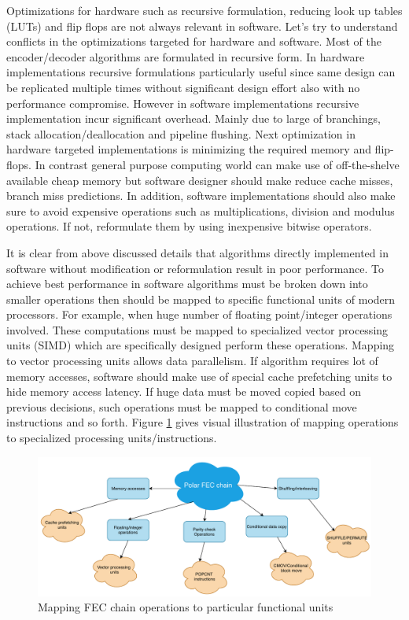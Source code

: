 Optimizations for hardware such as recursive formulation, reducing look up tables (LUTs) and flip flops are not always relevant in software. Let's try to understand conflicts in the optimizations targeted for hardware and software. Most of the encoder/decoder algorithms are formulated in recursive form. In hardware implementations recursive formulations particularly useful since same design can be replicated multiple times without significant design effort also with no performance compromise. However in software implementations recursive implementation incur significant overhead. Mainly due to large of branchings, stack allocation/deallocation and pipeline flushing. Next optimization in hardware targeted implementations is minimizing the required memory and flip-flops. In contrast general purpose computing world can make use of off-the-shelve available cheap memory but software designer should make reduce cache misses, branch miss predictions. In addition, software implementations should also make sure to avoid expensive operations such as multiplications, division and modulus operations. If not, reformulate them by using inexpensive bitwise operators. \newline

It is clear from above discussed details that algorithms directly implemented in software without modification or reformulation result in poor performance. To achieve best performance in software algorithms must be broken down into smaller operations then should be mapped to specific functional units of modern processors. For example, when huge number of floating point/integer operations involved. These computations must be mapped to specialized vector processing units (SIMD) which are specifically designed perform these operations. Mapping to vector processing units allows data parallelism. If algorithm requires lot of memory accesses, software should make use of special cache prefetching units to hide memory access latency. If huge data must be moved copied based on previous decisions, such operations must be mapped to conditional move instructions and so forth.  Figure \ref{fig:operationMapping} gives visual illustration of mapping operations to specialized processing units/instructions.

\begin{figure}[]
	\centering
	\includegraphics[width=1\textwidth]{./figures/operationMapping.pdf}
	\caption{Mapping FEC chain operations to particular functional units}
	\label{fig:operationMapping}
\end{figure}


